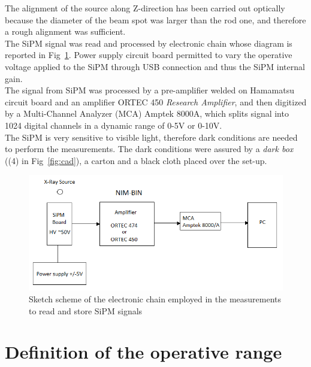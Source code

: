 \documentclass[10pt,a4paper, openany]{book}
\begin{document}
The alignment of the source along Z-direction has been carried out optically because the diameter of the beam spot was larger than the rod one, and therefore a rough alignment was sufficient.\\
The SiPM signal was read and processed by electronic chain whose diagram is reported in Fig~\ref{fig:el_scheme}. Power supply circuit board permitted to vary the operative voltage applied to the SiPM through USB connection and thus the SiPM internal gain.\\
The signal from SiPM was processed by a pre-amplifier welded on Hamamatsu circuit board and an amplifier ORTEC 450 \emph{Research Amplifier}, and then digitized by a Multi-Channel Analyzer (MCA) Amptek 8000A, which splits signal into 1024 digital channels in a dynamic range of 0-5V or 0-10V.\\
The SiPM is very sensitive to visible light, therefore dark conditions are needed to perform the measurements. The dark conditions were assured by a \emph{dark box} ((4) in Fig~\ref{fig:cad}), a carton and a black cloth placed over the set-up.

\begin{figure}[!h]
\begin{center}
\includegraphics[scale=0.55]{imm/chain.png}
\end{center}
\caption{Sketch scheme of the electronic chain employed in the measurements to read and store SiPM signals}
\label{fig:el_scheme}
\end{figure}
\newpage
\section{Definition of the operative range}
\end{document}
